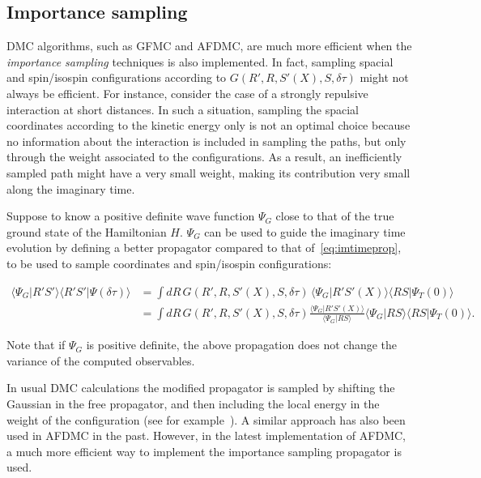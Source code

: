 \documentclass[aps,prc,twocolumn,superscriptaddress,floatfix]{revtex4-1}
\begin{document}
\subsection{Importance sampling}
\label{sec:is}
DMC algorithms, such as GFMC and AFDMC, are much more efficient when the \emph{importance sampling}
techniques is also implemented.
In fact, sampling spacial and spin/isospin configurations according to $G(R',R,S'(X),S,\delta\tau)$ 
might not always be efficient. For instance, consider the case of a strongly repulsive interaction 
at short distances. In such a situation, sampling the spacial coordinates according to the kinetic 
energy only is not an optimal choice because no information about the interaction is included in 
sampling the paths, but only through the weight associated to the configurations. 
As a result, an inefficiently sampled path might have a very small weight, making its contribution 
very small along the imaginary time.

Suppose to know a positive definite wave function $\Psi_G$ close to that of the true ground state of
the Hamiltonian $H$. $\Psi_G$ can be used to guide the imaginary time evolution by defining a
better propagator compared to that of~\cref{eq:imtimeprop}, to be used to sample coordinates and 
spin/isospin configurations:
\begin{widetext}
\begin{align}
\langle\Psi_G|R'S'\rangle\langle R'S'|\Psi(\delta\tau)\rangle
&=\displaystyle\int dR\,G(R',R,S'(X),S,\delta\tau)\,\langle\Psi_G|R'S'(X)\rangle\langle RS|\Psi_T(0)\rangle
\nonumber \\
&=\displaystyle\int dR\,G(R',R,S'(X),S,\delta\tau)\frac{\langle\Psi_G|R'S'(X)\rangle}{\langle\Psi_G|RS\rangle}
\langle\Psi_G|RS\rangle\langle RS|\Psi_T(0)\rangle .
\end{align}
\end{widetext}
Note that if $\Psi_G$ is positive definite, the above propagation does not change the 
variance of the computed observables.

In usual DMC calculations the modified propagator is sampled by shifting the Gaussian in
the free propagator, and then including the local energy in the weight of the configuration
(see for example~\cite{Foulkes:2001}). A similar approach has also been used in AFDMC in the past. 
However, in the latest implementation of AFDMC, a much more efficient way to implement the
importance sampling propagator is used.
\end{document}
